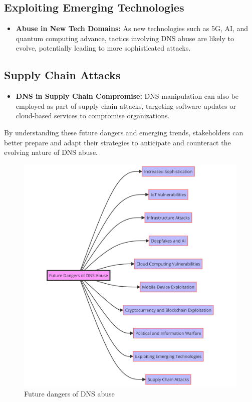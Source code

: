\subsection{Exploiting Emerging Technologies}
\begin{itemize}
    \item \textbf{Abuse in New Tech Domains:} As new technologies such as 5G, AI, and quantum computing advance, tactics involving DNS abuse are likely to evolve, potentially leading to more sophisticated attacks.\cite{brunner2021cybersecurity}
\end{itemize}

\subsection{Supply Chain Attacks}
\begin{itemize}
    \item \textbf{DNS in Supply Chain Compromise:} DNS manipulation can also be employed as part of supply chain attacks, targeting software updates or cloud-based services to compromise organizations.\cite{boyson2014cyber}
\end{itemize}

By understanding these future dangers and emerging trends, stakeholders can better prepare and adapt their strategies to anticipate and counteract the evolving nature of DNS abuse.

\clearpage
\begin{figure}[ht]
\centering
\includegraphics[width=1.2\textwidth]{background/DNSfutureDanger.png}
\caption{Future dangers of DNS abuse}
\label{fig:figureFive}
\end{figure}
\clearpage

